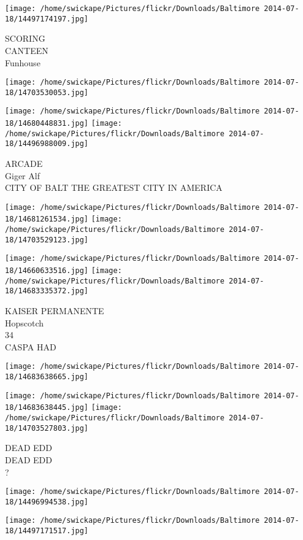 \documentclass[10pt,letterpaper]{article}
\begin{document}
\texttt{[image: /home/swickape/Pictures/flickr/Downloads/Baltimore 2014-07-18/14497174197.jpg]}

SCORING\\
CANTEEN\\
Funhouse
\pagebreak

\texttt{[image: /home/swickape/Pictures/flickr/Downloads/Baltimore 2014-07-18/14703530053.jpg]}

\vspace{0.25in}
\texttt{[image: /home/swickape/Pictures/flickr/Downloads/Baltimore 2014-07-18/14680448831.jpg]}
\texttt{[image: /home/swickape/Pictures/flickr/Downloads/Baltimore 2014-07-18/14496988009.jpg]}

ARCADE\\
Giger Alf\\
CITY OF BALT THE GREATEST CITY IN AMERICA
\pagebreak

\texttt{[image: /home/swickape/Pictures/flickr/Downloads/Baltimore 2014-07-18/14681261534.jpg]}
\texttt{[image: /home/swickape/Pictures/flickr/Downloads/Baltimore 2014-07-18/14703529123.jpg]}

\texttt{[image: /home/swickape/Pictures/flickr/Downloads/Baltimore 2014-07-18/14660633516.jpg]}
\texttt{[image: /home/swickape/Pictures/flickr/Downloads/Baltimore 2014-07-18/14683335372.jpg]}

KAISER PERMANENTE\\
Hopscotch\\
34\\
CASPA HAD
\pagebreak

\texttt{[image: /home/swickape/Pictures/flickr/Downloads/Baltimore 2014-07-18/14683638665.jpg]}

\vspace{0.25in}
\texttt{[image: /home/swickape/Pictures/flickr/Downloads/Baltimore 2014-07-18/14683638445.jpg]}
\texttt{[image: /home/swickape/Pictures/flickr/Downloads/Baltimore 2014-07-18/14703527803.jpg]}

DEAD EDD\\
DEAD EDD\\
?
\pagebreak

\texttt{[image: /home/swickape/Pictures/flickr/Downloads/Baltimore 2014-07-18/14496994538.jpg]}

\vspace{0.25in}
\texttt{[image: /home/swickape/Pictures/flickr/Downloads/Baltimore 2014-07-18/14497171517.jpg]}
\end{document}
